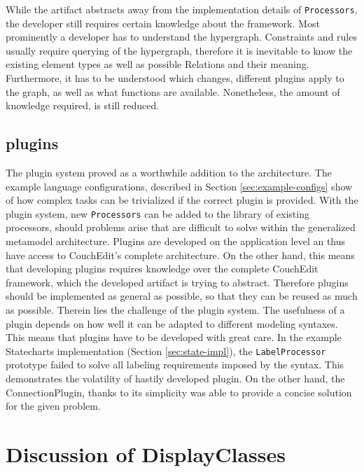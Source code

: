 While the artifact abstracts away from the implementation details of \texttt{Processors}, the developer still requires certain knowledge about the framework. Most prominently a developer has to understand the hypergraph. Constraints and rules usually require querying of the hypergraph, therefore it is inevitable to know the existing element types as well as possible Relations and their meaning. Furthermore, it has to be understood which changes, different plugins apply to the graph, as well as what functions are available. Nonetheless, the amount of knowledge required, is still reduced.   

\subsection{plugins}
The plugin system proved as a worthwhile addition to the architecture. The example language configurations, described in Section \ref{sec:example-configs} show of how complex tasks can be trivialized if the correct plugin is provided. With the plugin system, new \texttt{Processors} can be added to the library of existing processors, should problems arise that are difficult to solve within the generalized metamodel architecture. Plugins are developed on the application level an thus have access to CouchEdit's complete architecture. On the other hand, this means that developing plugins requires knowledge over the complete CouchEdit framework, which the developed artifact is trying to abstract. Therefore plugins should be implemented as general as possible, so that they can be reused as much as possible. Therein lies the challenge of the plugin system. The usefulness of a plugin depends on how well it can be adapted to different modeling syntaxes. This means that plugins have to be developed with great care. In the example Statecharts implementation (Section \ref{sec:state-impl}), the \texttt{LabelProcessor} prototype failed to solve all labeling requirements imposed by the syntax. This demonstrates the volatility of hastily developed plugin. On the other hand, the ConnectionPlugin, thanks to its simplicity was able to provide a concise solution for the given problem.

\section{Discussion of DisplayClasses}
 



